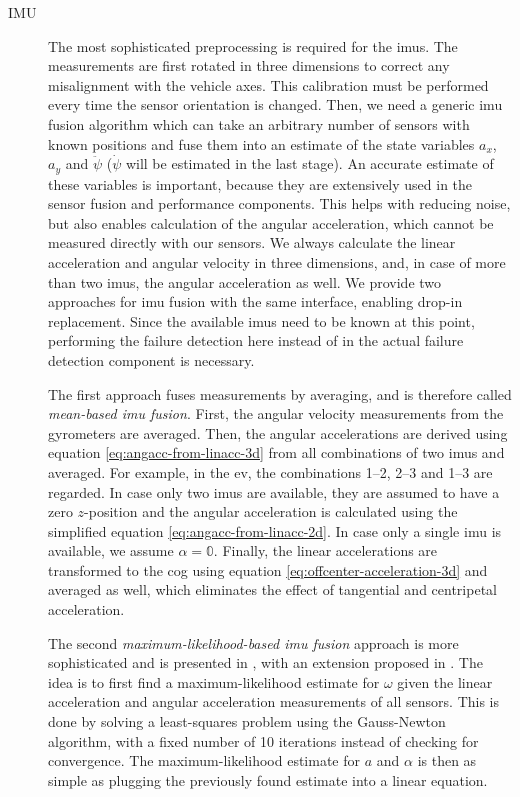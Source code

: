 \begin{description}
\item[IMU] The most sophisticated preprocessing is required for the \glspl{imu}. The measurements are first rotated in three dimensions to correct any misalignment with the vehicle axes. This calibration must be performed every time the sensor orientation is changed. Then, we need a generic \gls{imu} fusion algorithm which can take an arbitrary number of sensors with known positions and fuse them into an estimate of the state variables $a_x$, $a_y$ and $\ddot{\psi}$ ($\dot{\psi}$ will be estimated in the last stage). An accurate estimate of these variables is important, because they are extensively used in the sensor fusion and performance components. This helps with reducing noise, but also enables calculation of the angular acceleration, which cannot be measured directly with our sensors. We always calculate the linear acceleration and angular velocity in three dimensions, and, in case of more than two \glspl{imu}, the angular acceleration as well. We provide two approaches for \gls{imu} fusion with the same interface, enabling drop-in replacement. Since the available \glspl{imu} need to be known at this point, performing the failure detection here instead of in the actual failure detection component is necessary.

The first approach fuses measurements by averaging, and is therefore called \textit{mean-based \gls{imu} fusion}. First, the angular velocity measurements from the gyrometers are averaged. Then, the angular accelerations are derived using equation \ref{eq:angacc-from-linacc-3d} from all combinations of two \glspl{imu} and averaged. For example, in the \gls{ev}, the combinations 1--2, 2--3 and 1--3 are regarded. In case only two \glspl{imu} are available, they are assumed to have a zero $z$-position and the angular acceleration is calculated using the simplified equation \ref{eq:angacc-from-linacc-2d}. In case only a single \gls{imu} is available, we assume $\alpha = \mathbb{0}$. Finally, the linear accelerations are transformed to the \gls{cog} using equation \ref{eq:offcenter-acceleration-3d} and averaged as well, which eliminates the effect of tangential and centripetal acceleration.

The second \textit{maximum-likelihood-based \gls{imu} fusion} approach is more sophisticated and is presented in \cite{Skog.2016}, with an extension proposed in \cite{Wahlstrom.2018}. The idea is to first find a maximum-likelihood estimate for $\omega$ given the linear acceleration and angular acceleration measurements of all sensors. This is done by solving a least-squares problem using the Gauss-Newton algorithm, with a fixed number of 10 iterations instead of checking for convergence. The maximum-likelihood estimate for $a$ and $\alpha$ is then as simple as plugging the previously found estimate into a linear equation.


\end{description}
